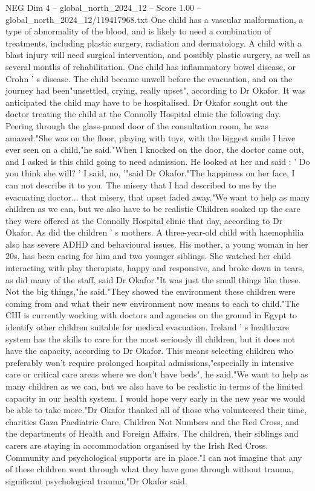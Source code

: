 \begin{textsample}{NEG Dim 4 – global\_north\_2024\_12 – Score 1.00 – global\_north\_2024\_12/119417968.txt}
One child has a vascular malformation, a type of abnormality of the blood, and is likely to need a combination of treatments, including plastic surgery, radiation and dermatology.
A child with a blast injury will need surgical intervention, and possibly plastic surgery, as well as several months of rehabilitation.
One child has inflammatory bowel disease, or Crohn ' s disease.
The child became unwell before the evacuation, and on the journey had been"unsettled, crying, really upset", according to Dr Okafor.
It was anticipated the child may have to be hospitalised.
Dr Okafor sought out the doctor treating the child at the Connolly Hospital clinic the following day.
Peering through the glass-paned door of the consultation room, he was amazed."She was on the floor, playing with toys, with the biggest smile I have ever seen on a child,"he said."When I knocked on the door, the doctor came out, and I asked is this child going to need admission.
He looked at her and said : ' Do you think she will? ' I said, no, '"said Dr Okafor."The happiness on her face, I can not describe it to you.
The misery that I had described to me by the evacuating doctor... that misery, that upset faded away."We want to help as many children as we can, but we also have to be realistic Children soaked up the care they were offered at the Connolly Hospital clinic that day, according to Dr Okafor.
As did the children ' s mothers.
A three-year-old child with haemophilia also has severe ADHD and behavioural issues.
His mother, a young woman in her 20s, has been caring for him and two younger siblings.
She watched her child interacting with play therapists, happy and responsive, and broke down in tears, as did many of the staff, said Dr Okafor."It was just the small things like these.
Not the big things,"he said."They showed the environment these children were coming from and what their new environment now means to each to child."The CHI is currently working with doctors and agencies on the ground in Egypt to identify other children suitable for medical evacuation.
Ireland ' s healthcare system has the skills to care for the most seriously ill children, but it does not have the capacity, according to Dr Okafor.
This means selecting children who preferably won't require prolonged hospital admissions,"especially in intensive care or critical care areas where we don't have beds", he said."We want to help as many children as we can, but we also have to be realistic in terms of the limited capacity in our health system.
I would hope very early in the new year we would be able to take more."Dr Okafor thanked all of those who volunteered their time, charities Gaza Paediatric Care, Children Not Numbers and the Red Cross, and the departments of Health and Foreign Affairs.
The children, their siblings and carers are staying in accommodation organised by the Irish Red Cross.
Community and psychological supports are in place."I can not imagine that any of these children went through what they have gone through without trauma, significant psychological trauma,"Dr Okafor said.

\end{textsample}
